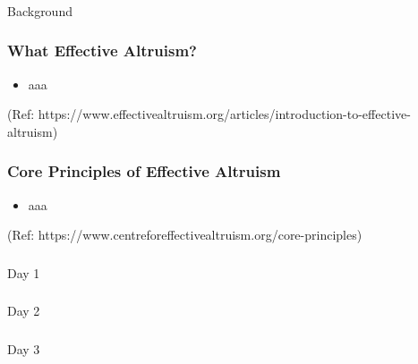 \begin{frame}[fragile]\frametitle{}
\begin{center}
{\Large Background}
\end{center}
\end{frame}

\begin{frame}[fragile]\frametitle{What Effective Altruism?}
      \begin{itemize}
        \item aaa
      \end{itemize}
	  
{\tiny (Ref: https://www.effectivealtruism.org/articles/introduction-to-effective-altruism)}  	  
  
\end{frame}

\begin{frame}[fragile]\frametitle{Core Principles of Effective Altruism}
      \begin{itemize}
        \item aaa
      \end{itemize}
	  
	
{\tiny (Ref: https://www.centreforeffectivealtruism.org/core-principles)}  	  
\end{frame}

\begin{frame}[fragile]\frametitle{}
\begin{center}
{\Large Day 1}
\end{center}
\end{frame}

\begin{frame}[fragile]\frametitle{}
\begin{center}
{\Large Day 2}
\end{center}
\end{frame}


\begin{frame}[fragile]\frametitle{}
\begin{center}
{\Large Day 3}
\end{center}
\end{frame}



